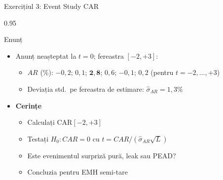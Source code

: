 \documentclass[9pt, aspectratio=169, t]{beamer}
\begin{document}
\begin{frame}[shrink=15]{Exercițiul 3: Event Study CAR}
\begin{cminipage}{0.95\textwidth}
\begin{block}{Enunț}
\begin{itemize}\setlength{\itemsep}{0pt}
    \item Anunț neașteptat la $t = 0$; fereastra $[-2, +3]$:
    \begin{itemize}\setlength{\itemsep}{0pt}
        \item $AR$ (\%): $-0{,}2$; $0{,}1$; $\mathbf{2{,}8}$; $0{,}6$; $-0{,}1$; $0{,}2$ (pentru $t = -2, \ldots, +3$)
        \item Deviația std.\ pe fereastra de estimare: $\hat\sigma_{AR} = 1{,}3\%$
    \end{itemize}
\end{itemize}
\end{block}

\begin{itemize}\setlength{\itemsep}{0pt}
    \item \textbf{Cerințe}
    \begin{itemize}\setlength{\itemsep}{0pt}
        \item Calculați CAR$[-2, +3]$
        \item Testați $H_0: CAR = 0$ cu $t = CAR/(\hat\sigma_{AR}\sqrt{L})$
        \item Este evenimentul surpriză pură, leak sau PEAD?
        \item Concluzia pentru EMH semi-tare
    \end{itemize}
\end{itemize}
\end{cminipage}
\end{frame}
\end{document}
